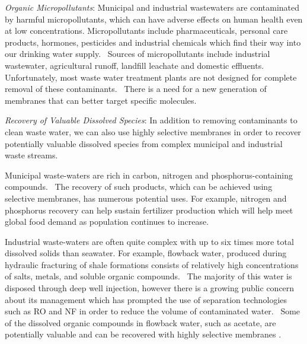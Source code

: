   \textit{Organic Micropollutants}: Municipal and industrial wastewaters are contaminated
  by harmful micropollutants, which can have adverse effects on human health even at low 
  concentrations.\cite{schwarzenbach_challenge_2006} Micropollutants include pharmaceuticals,
  personal care products, hormones, pesticides and industrial chemicals which find their way
  into our drinking water supply.~\cite{barbosa_occurrence_2016} Sources of micropollutants
  include industrial wastewater, agricultural runoff, landfill leachate and domestic 
  effluents.~\cite{mompelat_occurrence_2009} Unfortunately, most waste water treatment 
  plants are not designed for complete removal of these contaminants.~\cite{tijani_review_2013}
  There is a need for a new generation of membranes that can better target specific molecules.
  
  \textit{Recovery of Valuable Dissolved Species}: In addition to removing contaminants 
  to clean waste water, we can also use highly selective membranes in order to recover
  potentially valuable dissolved species from complex municipal and industrial waste
  streams.~\cite{guest_new_2009,daigger_evolving_2009}
  
  Municipal waste-waters are rich in carbon, nitrogen and phosphorus-containing 
  compounds.~\cite{romero_raw_2013} The recovery of such products, which can be 
  achieved using selective membranes, has numerous potential uses.\cite{sales_resource_2015}
  For example, nitrogen and phosphorus recovery can help sustain fertilizer 
  production which will help meet global food demand as population continues
  to increase.\cite{xie_membrane-based_2016}

  Industrial waste-waters are often quite complex with up to six times more 
  total dissolved solids than seawater.\cite{werber_materials_2016} For example,
  flowback water, produced during hydraulic fracturing of shale formations consists
  of relatively high concentrations of salts, metals, and soluble organic 
  compounds.~\cite{orem_organic_2014} The majority of this water is disposed 
  through deep well injection, however there is a growing public concern about
  its management which has prompted the use of separation technologies such as 
  RO and NF in order to reduce the volume of contaminated water.~\cite{gregory_water_2011}
  Some of the dissolved organic compounds in flowback water, such as acetate, 
  are potentially valuable and can be recovered with highly selective membranes
  \cite{dischinger_application_2017}.

